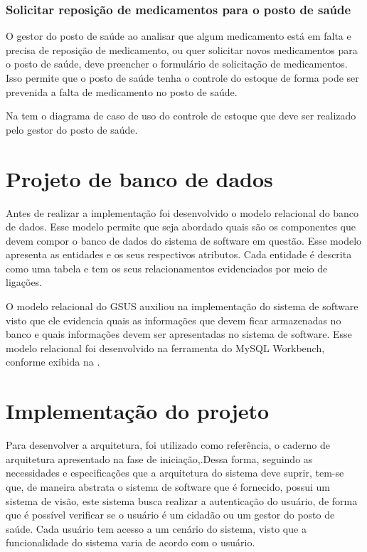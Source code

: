 \subsubsection{Solicitar reposição de medicamentos para o posto de saúde}

O gestor do posto de saúde ao analisar que algum medicamento está em falta e precisa de reposição de medicamento, ou quer solicitar novos medicamentos para o posto de saúde, deve preencher o formulário de solicitação de medicamentos. Isso permite que o posto de saúde tenha o controle do estoque de forma pode ser prevenida a falta de medicamento no posto de saúde.

Na  tem o diagrama de caso de uso do controle de estoque que deve ser realizado pelo gestor do posto de saúde.

%

\section{Projeto de banco de dados}

Antes de realizar a implementação foi desenvolvido o modelo relacional do banco de dados. Esse modelo permite que seja abordado quais são os componentes que devem compor o banco de dados do sistema de software em questão. Esse modelo apresenta as entidades e os seus respectivos atributos. Cada entidade é descrita como uma tabela e tem os seus relacionamentos evidenciados por meio de ligações.

O modelo relacional do GSUS auxiliou na implementação do sistema de software visto que ele evidencia quais as informações que devem ficar armazenadas no banco e quais informações devem ser apresentadas no sistema de software. Esse modelo relacional foi desenvolvido na ferramenta do MySQL Workbench, conforme exibida na .


%


\section{Implementação do projeto}

Para desenvolver a arquitetura, foi utilizado como referência, o caderno de arquitetura apresentado na fase de iniciação,.Dessa forma, seguindo as necessidades e especificações que a arquitetura do sistema deve suprir, tem-se que, de maneira abstrata o sistema de software que é fornecido, possui um sistema de visão, este sistema busca realizar a autenticação do usuário, de forma que é possível verificar se o usuário é um cidadão ou um gestor do posto de saúde. Cada usuário tem acesso a um cenário do sistema, visto que a funcionalidade do sistema varia de acordo com o usuário. 

